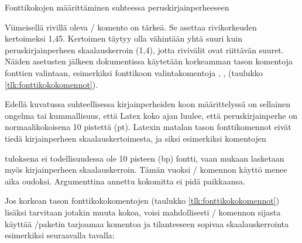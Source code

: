 \begin{esimerkki*}

\caption{Fonttikokojen määrittäminen suhteessa peruskirjainperheeseen}
\label{esim:fontti_suhteellinen}
\end{esimerkki*}

Viimeisellä rivillä oleva \-/ komento on tärkeä. Se
asettaa rivikorkeuden kertoimeksi 1,45. Kertoimen täytyy olla vähintään
yhtä suuri kuin peruskirjainperheen skaalauskerroin (1,4), jotta
rivivälit ovat riittävän suuret. Näiden asetusten jälkeen dokumentissa
käytetään korkeamman tason komentoja fonttien valintaan, esimerkiksi
fonttikoon valintakomentoja , ,
 (taulukko \ref{tlk:fonttikokokomennot}).

Edellä kuvatussa suhteellisessa kirjainperheiden koon määrittelyssä on
sellainen ongelma tai kummallisuus, että Latex koko ajan luulee, että
peruskirjainperhe on normaalikokoisena 10 pistettä (pt). Latexin matalan
tason fonttikomennot eivät tiedä kirjainperheen skaalauskertoimesta, ja
siksi esimerkiksi komentojen

\begin{koodilohkosis}
  \fontsize{10bp}{12bp} \selectfont
\end{koodilohkosis}

tuloksena ei todellisuudessa ole 10 pisteen (bp) fontti, vaan mukaan
lasketaan myös kirjainperheen skaalauskerroin. Tämän vuoksi
\-/ komennon käyttö menee aika oudoksi. Argumenttina
annettu kokomitta ei pidä paikkaansa.

Jos korkean tason fonttikokokomentojen (taulukko
\ref{tlk:fonttikokokomennot}) lisäksi tarvitaan jotakin muuta kokoa,
voisi mahdollisesti \-/ komennon sijasta käyttää
\-/paketin tarjoamaa komentoa ja tilanteeseen sopivaa
skaalauskerrointa esimerkiksi seuraavalla tavalla:

